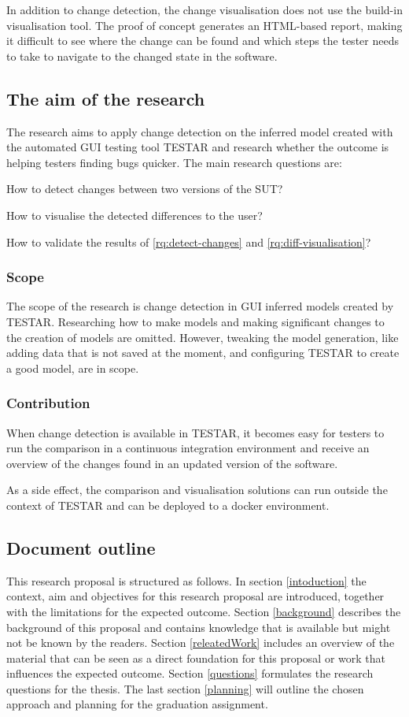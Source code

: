In addition to change detection, the change visualisation does not use the build-in visualisation tool. The proof of concept generates an HTML-based report, making it difficult to see where the change can be found and which steps the tester needs to take to navigate to the changed state in the software.

\subsection{The aim of the research}
The research aims to apply change detection on the inferred model created with the automated GUI testing tool TESTAR and research whether the outcome is helping testers finding bugs quicker. The main research questions are:

\begin{questions}
    \item How to detect changes between two versions of the SUT?
	\item How to visualise the detected differences to the user? 
\item How to validate the results of \ref{rq:detect-changes} and \ref{rq:diff-visualisation}?
\end{questions}

\subsubsection{Scope}
The scope of the research is change detection in GUI inferred models created by TESTAR. Researching how to make models and making significant changes to the creation of models are omitted. However, tweaking the model generation, like adding data that is not saved at the moment, and configuring TESTAR to create a good model, are in scope.

\subsubsection{Contribution}
When change detection is available in TESTAR, it becomes easy for testers to run the comparison in a continuous integration environment and receive an overview of the changes found in an updated version of the software.

As a side effect, the comparison and visualisation solutions can run outside the context of TESTAR and can be deployed to a docker environment.

\subsection{Document outline}
This research proposal is structured as follows. In section \ref{intoduction} the context, aim and objectives for this research proposal are introduced, together with the limitations for the expected outcome. Section \ref{background} describes the background of this proposal and contains knowledge that is available but might not be known by the readers. Section \ref{releatedWork} includes an overview of the material that can be seen as a direct foundation for this proposal or work that influences the expected outcome. Section \ref{questions} formulates the research questions for the thesis. The last section \ref{planning} will outline the chosen approach and planning for the graduation assignment.
